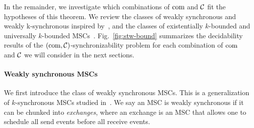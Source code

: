 In the remainder, we investigate which combinations of $\textup{com}$ and $\mathcal{C}$ fit the hypotheses of this theorem.
We review the classes of weakly synchronous and weakly k-synchronous inspired
by~\cite{DBLP:conf/cav/BouajjaniEJQ18},
and the classes of existentially $k$-bounded and universally $k$-bounded MSCs~\cite{genest2004kleene}.
%
%
Fig.~\ref{fig:stw-bound} summarizes the decidability results of the
$(\textup{com},\mathcal{C})$-synchronizability problem for each combination of $\textup{com}$ and $\mathcal{C}$ 
we will consider in the next sections.







\paragraph{\bf Weakly synchronous MSCs}

We first introduce the class of weakly synchronous MSCs. 
This is a generalization of $k$-synchronous MSCs studied 
in~\cite{DBLP:conf/cav/BouajjaniEJQ18}. 
We say an MSC is weakly synchronous if it can be chunked into \emph{exchanges}, where an exchange is an MSC that allows one to schedule all 
send events before all receive events. 

